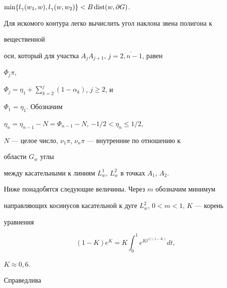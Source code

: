 $\min\{l_\gamma (w_1,w),l_\gamma


(w,w_2)\}<B\dist(w,\partial G)$.





Для искомого контура легко вычислить угол наклона звена полигона к 


вещественной


оси, который для участка $A_jA_{j+1}$, $j=\overline{2,n-1}$, равен


$\Phi_j\pi$,


$\Phi_j=\eta_1+\sum\limits_{k=2}^{j}(1-\alpha_k)$, $j\ge 2$, и


$\Phi_1=\eta_1$. Обозначим


$\eta_n=\eta_{n-1}-N=\Phi_{n-1}-N$, $-1/2<\eta_n\le{1/2}$,


$N$ --- целое число, $\nu_1\pi$, $\nu_n\pi $ --- внутренние по отношению к 


области $G_w$ углы


между касательными к линиям $L_w^1$, $L_w^2 $ в точках $A_1$, $A_2$.


Ниже понадобятся следующие величины. Через $m$ обозначим минимум


направляющих косинусов касательной к дуге $L_w^2$, $0<m<1$, $K$ --- корень


уравнения


$$


(1-K)e^{K}=K\int_{0}^{1}e^{Kt^{1/(1-K)}}dt,


$$


$K\approx 0,6$.





Справедлива





